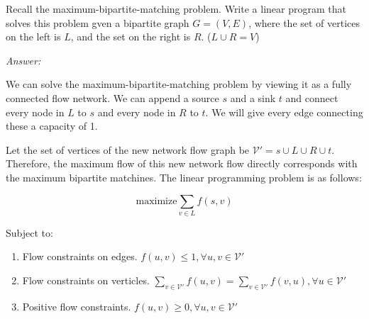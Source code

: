 \documentclass[12pt]{article}
\newenvironment{problem}[2][Problem]{\begin{trivlist}
\item[\hskip \labelsep {\bfseries #1}\hskip \labelsep {\bfseries #2.}]}{\end{trivlist}}
\begin{document}
\begin{problem}{4}
    Recall the maximum-bipartite-matching problem. Write a linear program that solves this problem gven a bipartite graph $G=(V,E)$, where the set of vertices on the left is $L$, and the set on the right is $R$. ($L \cup R = V$)
\end{problem}

\textit{Answer:} 

We can solve the maximum-bipartite-matching problem by viewing it as a fully connected flow network. We can append a source $s$ and a sink $t$ and connect every node in $L$ to $s$ and every node in $R$ to $t$. We will give every edge connecting these a capacity of 1.

Let the set of vertices of the new network flow graph be $\mathcal{V'} = {s} \cup L \cup R \cup {t}$. Therefore, the maximum flow of this new network flow directly corresponds with the maximum bipartite matchines. The linear programming problem is as follows:

$$
\text{maximize} \sum_{v \in L} f(s, v)
$$

Subject to:
\begin{enumerate}[1.]
    \item Flow constraints on edges. $f(u,v)  \leq1, \forall u,v \in \mathcal{V'}$
    \item Flow constraints on verticles. $\sum_{v \in \mathcal{V'}} f(u,v) = \sum_{v \in \mathcal{V'}} f(v,u), \forall u \in \mathcal{V'}$
    \item Positive flow constraints. $f(u,v) \geq 0, \forall u,v \in \mathcal{V'}$
\end{enumerate}
\end{document}
